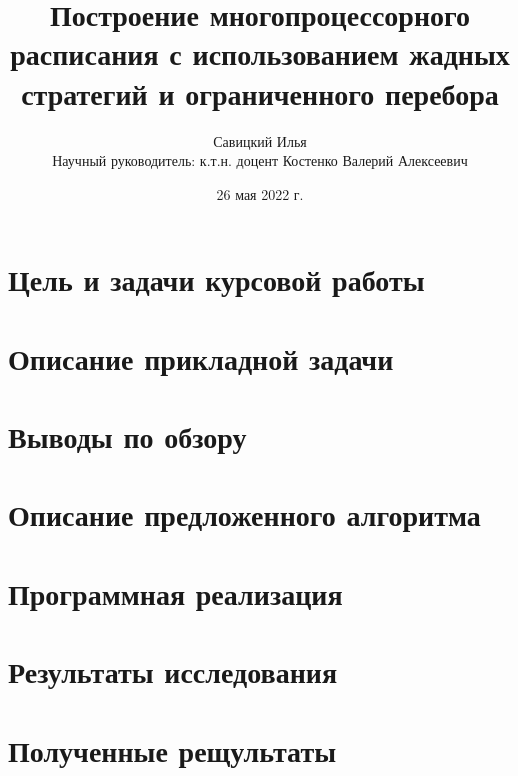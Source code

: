 \documentclass[hyperref=unicode, aspectratio=169]{beamer}
\title[]{Построение многопроцессорного расписания с использованием жадных стратегий и ограниченного перебора}
\author[]{Савицкий Илья\\Научный руководитель: к.т.н. доцент Костенко Валерий Алексеевич}
\date{26 мая 2022 г.}
\begin{document}
\begin{frame}
    \titlepage
\end{frame}

\section{Цель и задачи курсовой работы}


\section{Описание прикладной задачи}


\section{Выводы по обзору}


\section{Описание предложенного алгоритма}


\section{Программная реализация}


\section{Результаты исследования}


\section{Полученные рещультаты}

\end{document}
